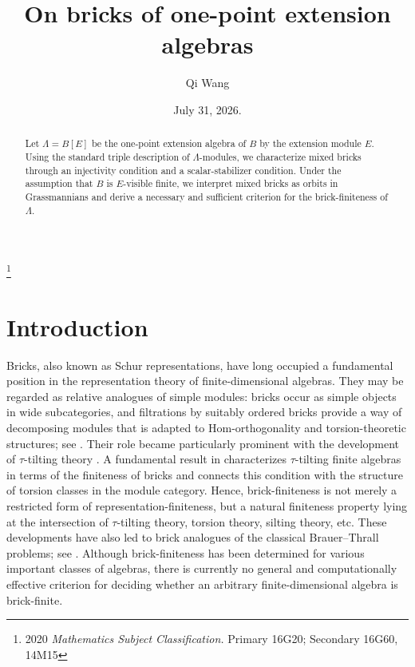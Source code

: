 \documentclass[a4,12pt]{amsart}
\numberwithin{equation}{section} %
\theoremstyle{definition} %
\begin{document}
\setlength{\baselineskip}{17pt}

\title{On bricks of one-point extension algebras}
\begin{abstract}
Let $\Lambda=B[E]$ be the one-point extension algebra of $B$ by the extension module $E$. Using the standard triple description of $\Lambda$-modules, we characterize mixed bricks through an injectivity condition and a scalar-stabilizer condition. Under the assumption that $B$ is $E$-visible finite, we interpret mixed bricks as orbits in Grassmannians and derive a necessary and sufficient criterion for the brick-finiteness of $\Lambda$.
\end{abstract}

\author{Qi Wang}
\address{School of Mathematical Sciences, Dalian University of Technology, Dalian City, Liaoning Province 116024, China}

\thanks{2020 {\em Mathematics Subject Classification.}
Primary 16G20; Secondary 16G60, 14M15}


\date{July 31, 2026.}
\maketitle

\section{Introduction}
Bricks, also known as Schur representations, have long occupied a fundamental position in the representation theory of finite-dimensional algebras. They may be regarded as relative analogues of simple modules: bricks occur as simple objects in wide subcategories, and filtrations by suitably ordered bricks provide a way of decomposing modules that is adapted to Hom-orthogonality and torsion-theoretic structures; see \cite{Asai-semibricks, BTZ-brick, Ringel-bricks, Ringel-brick-chain-filtrations}. Their role became particularly prominent with the development of $\tau$-tilting theory \cite{Adachi-Iyama-Reiten-2014}. A fundamental result in \cite{Demonet-Iyama-Jasso-2019} characterizes $\tau$-tilting finite algebras in terms of the finiteness of bricks and connects this condition with the structure of torsion classes in the module category. Hence, brick-finiteness is not merely a restricted form of representation-finiteness, but a natural finiteness property lying at the intersection of $\tau$-tilting theory, torsion theory, silting theory, etc. These developments have also led to brick analogues of the classical Brauer--Thrall problems; see \cite{Mousavand-minimal-tau-infinite, Mousavand-Paquette-survey, Schroll-Treffinger-first-BT, Schroll-Treffinger-Valdivieso-band}. Although brick-finiteness has been determined for various important classes of algebras, there is currently no general and computationally effective criterion for deciding whether an arbitrary finite-dimensional algebra is brick-finite.
\end{document}
